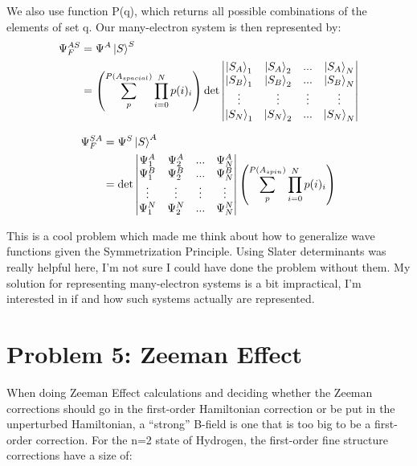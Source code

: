 \documentclass[10pt]{article} %
\begin{document}
We also use function P(q), which returns all possible combinations of the elements of set q. Our
many-electron system is then represented by:\\

\begin{align*}
  \Psi_F^{AS} &= \Psi^A\ket{S}^S\\
  &= \left(\sum_p^{P(A_{spacial})}\prod_{i=0}^N p(i)_i\right)\det
  \begin{vmatrix}
    \ket{S_A}_1 & \ket{S_A}_2 & ... & \ket{S_A}_N\\
    \ket{S_B}_1 & \ket{S_B}_2 & ... & \ket{S_B}_N\\
    \vdots & \vdots & \vdots & \vdots\\
    \ket{S_N}_1 & \ket{S_N}_2 & ... & \ket{S_N}_N\\
  \end{vmatrix}
\end{align*}

\begin{align*}
  \Psi_F^{SA} &= \Psi^S\ket{S}^A\\
  &= \det
  \begin{vmatrix}
    \Psi^A_1 & \Psi^A_2 & ... & \Psi^A_N\\
    \Psi^B_1 & \Psi^B_2 & ... & \Psi^B_N\\
    \vdots & \vdots & \vdots & \vdots\\
    \Psi^N_1 & \Psi^N_2 & ... & \Psi^N_N\\
  \end{vmatrix}
  \left(\sum_p^{P(A_{spin})}\prod_{i=0}^N p(i)_i\right)
\end{align*}

This is a cool problem which made me think about how to generalize wave functions given the
Symmetrization Principle. Using Slater determinants was really helpful here, I'm not sure I could
have done the problem without them. My solution for representing many-electron systems is a bit
impractical, I'm interested in if and how such systems actually are represented.\\

\section{Problem 5: Zeeman Effect}
When doing Zeeman Effect calculations and deciding whether the Zeeman corrections should go in the
first-order Hamiltonian correction or be put in the unperturbed Hamiltonian, a ``strong'' B-field
is one that is too big to be a first-order correction. For the n=2 state of Hydrogen, the
first-order fine structure corrections have a size of:
\end{document}
